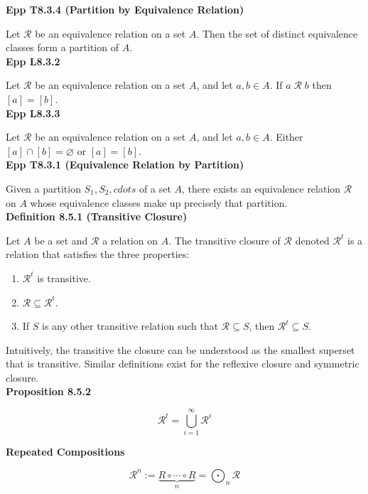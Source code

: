\documentclass[a4paper]{article}
\newcommand{\subheading}[1]{{\scriptsize\textbf{#1}}}
\begin{document}
\begin{multicols*}{4}
\subheading{Epp T8.3.4 (Partition by Equivalence Relation)}

Let $\mathcal{R}$ be an equivalence relation on a set $A$. Then the set of
distinct equivalence classes form a partition of $A$.\\

\subheading{Epp L8.3.2}

Let $\mathcal{R}$ be an equivalence relation on a set $A$, and let $a, b \in A$.
If $a\;\mathcal{R}\;b$ then $[a]=[b]$.\\

\subheading{Epp L8.3.3}

Let $\mathcal{R}$ be an equivalence relation on a set $A$, and let $a, b \in A$.
Either $[a] \cap [b] = \varnothing$ or $[a] = [b]$.\\

\subheading{Epp T8.3.1 (Equivalence Relation by Partition)}

Given a partition $S_1, S_2, cdots$ of a set $A$, there exists an equivalence
relation $\mathcal{R}$ on $A$ whose equivalence classes make up precisely that
partition. \\

\subheading{Definition 8.5.1 (Transitive Closure)}

Let $A$ be a set and $\mathcal{R}$ a relation on $A$. The transitive closure of
$\mathcal{R}$ denoted $\mathcal{R}^t$ is a relation that satisfies the three
properties:
\begin{enumerate} \itemsep -0.5em
  \item $\mathcal{R}^t$ is transitive.
  \item $\mathcal{R} \subseteq \mathcal{R}^t$.
  \item If $\textit{S}$ is any other transitive relation such that $\mathcal{R}
    \subseteq \textit{S}$, then $\mathcal{R}^t \subseteq \textit{S}$.
\end{enumerate}
Intuitively, the transitive the closure can be understood as the smallest
superset that is transitive. Similar definitions exist for the reflexive closure
and symmetric closure.\\


\subheading{Proposition 8.5.2}

$$\mathcal{R}^t = \bigcup^\infty_{i=1} \mathcal{R}^i$$

\subheading{Repeated Compositions}

$$\mathcal{R}^n := \underbrace{R \circ \cdots \circ R}_n
    = \bigodot_n \mathcal{R}$$


\end{multicols*}
\end{document}

